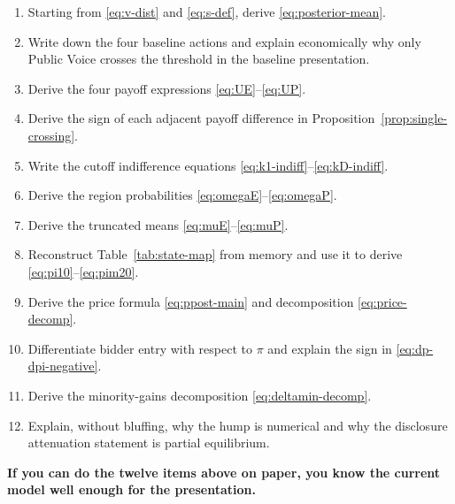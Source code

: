 \documentclass[11pt,a4paper]{article}
\theoremstyle{definition}
\theoremstyle{plain}
\theoremstyle{remark}
\newcommand{\1}{\mathbf{1}}
\begin{document}
\begin{enumerate}
\item Starting from \eqref{eq:v-dist} and \eqref{eq:s-def}, derive \eqref{eq:posterior-mean}.
\item Write down the four baseline actions and explain economically why only Public Voice crosses the threshold in the baseline presentation.
\item Derive the four payoff expressions \eqref{eq:UE}--\eqref{eq:UP}.
\item Derive the sign of each adjacent payoff difference in Proposition~\ref{prop:single-crossing}.
\item Write the cutoff indifference equations \eqref{eq:k1-indiff}--\eqref{eq:kD-indiff}.
\item Derive the region probabilities \eqref{eq:omegaE}--\eqref{eq:omegaP}.
\item Derive the truncated means \eqref{eq:muE}--\eqref{eq:muP}.
\item Reconstruct Table~\ref{tab:state-map} from memory and use it to derive \eqref{eq:pi10}--\eqref{eq:pim20}.
\item Derive the price formula \eqref{eq:ppost-main} and decomposition \eqref{eq:price-decomp}.
\item Differentiate bidder entry with respect to $\pi$ and explain the sign in \eqref{eq:dp-dpi-negative}.
\item Derive the minority-gains decomposition \eqref{eq:deltamin-decomp}.
\item Explain, without bluffing, why the hump is numerical and why the disclosure attenuation statement is partial equilibrium.
\end{enumerate}

\begin{statusbox}
\textbf{If you can do the twelve items above on paper, you know the current model well enough for the presentation.}
\end{statusbox}
\end{document}
